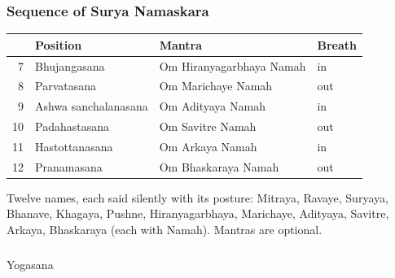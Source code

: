 \begin{frame}[fragile]\frametitle{Sequence of Surya Namaskara}

        \begin{center}
        {\small
        \begin{tabular}{@{}rlll@{}}
        \toprule
        & \textbf{Position} & \textbf{Mantra} & \textbf{Breath} \\
        \midrule
        7 & Bhujangasana & Om Hiranyagarbhaya Namah & in \\
        8 & Parvatasana & Om Marichaye Namah & out \\
        9 & Ashwa sanchalanasana & Om Adityaya Namah & in \\
        10 & Padahastasana & Om Savitre Namah & out \\
        11 & Hastottanasana & Om Arkaya Namah & in \\
        12 & Pranamasana & Om Bhaskaraya Namah & out \\
        \bottomrule
        \end{tabular}}

		\vspace{0.5em}
		{\small Twelve names, each said silently with its posture: Mitraya, Ravaye, Suryaya, Bhanave, Khagaya, Pushne, Hiranyagarbhaya, Marichaye, Adityaya, Savitre, Arkaya, Bhaskaraya (each with Namah). Mantras are optional.}

        \end{center}	

\end{frame}

\begin{frame}[fragile]\frametitle{}
\begin{center}
{\Large Yogasana}
\end{center}
\end{frame}

